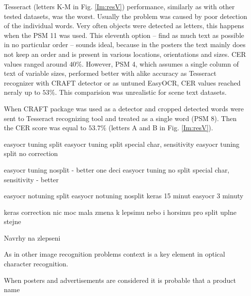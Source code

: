 Tesseract (letters K-M in Fig. \ref*{Im:resV}) performance, similarly as with other tested datasets, was the worst. Usually the problem was caused by poor detection of the individual words. Very often objects were detected as letters, this happens when the PSM 11 was used. This eleventh option --  find as much text as possible in no particular order -- sounds ideal, because in the posters the text mainly does not keep an order and is present in various locations, orientations and sizes. CER values ranged around $40\%$. However, PSM 4, which assumes a single column of text of variable sizes, performed better with alike accuracy as Tesseract recognizer with CRAFT detector or as untuned EasyOCR, CER values reached neraly up to $53\%$. This comparision was unrealistic for scene text datasets.

When CRAFT package was used as a detector and cropped detected words were sent to Tesseract recognizing tool and treated as a single word (PSM 8). Then the CER score was equal to $53.7\%$ (letters A and B in Fig. \ref*{Im:resV}).



easyocr tuning split
easyocr tuning split special char, sensitivity
easyocr tuning split no correction

easyocr tuning nosplit - better one deci
easyocr tuning no split special char, sensitivity - better

easyocr notuning split
easyocr notuning nosplit 
keras 15 minut easyocr 3 minuty


keras correction nic moc mala zmena k lepsimu nebo i horsimu pro split uplne stejne

Navrhy na zlepseni

As in other image recognition problems context is a key element in optical character recognition. 

When posters and advertisements are considered it is probable that a product name 
